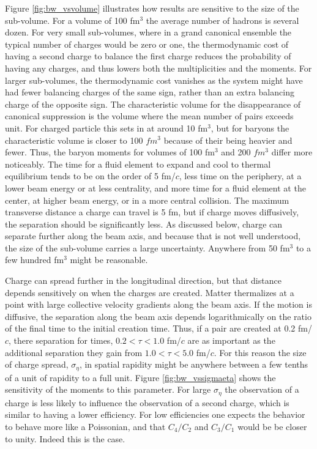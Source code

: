 {Figure \ref{fig:bw_vsvolume} illustrates how results are sensitive to the size of the sub-volume. For a volume of 100 fm$^3$ the average number of hadrons is several dozen. For very small sub-volumes, where in a grand canonical ensemble the typical number of charges would be zero or one, the thermodynamic cost of having a second charge to balance the first charge reduces the probability of having any charges, and thus lowers both the multiplicities and the moments. For larger sub-volumes, the thermodynamic cost vanishes as the system might have had fewer balancing charges of the same sign, rather than an extra balancing charge of the opposite sign. The characteristic volume for the disappearance of canonical suppression is the volume where the mean number of pairs exceeds unit. For charged particle this sets in at around 10 fm$^3$, but for baryons the characteristic volume is closer to 100 $fm^3$ because of their being heavier and fewer. Thus, the baryon moments for volumes of 100 fm$^3$ and 200 $fm^3$ differ more noticeably. The time for a fluid element to expand and cool to thermal equilibrium tends to be on the order of 5 fm/$c$, less time on the periphery, at a lower beam energy or at less centrality, and more time for a fluid element at the center, at higher beam energy, or in a more central collision. The maximum transverse distance a charge can travel is 5 fm, but if charge moves diffusively, the separation should be significantly less. As discussed below, charge can separate further along the beam axis, and because that is not well understood, the size of the sub-volume carries a large uncertainty. Anywhere from 50 fm$^3$ to a few hundred fm$^3$ might be reasonable. 

Charge can spread further in the longitudinal direction, but that distance depends sensitively on when the charges are created. Matter thermalizes at a point with large collective velocity gradients along the beam axis. If the motion is diffusive, the separation along the beam axis depends logarithmically on the ratio of the final time to the initial creation time.  Thus, if a pair are created at 0.2 fm/$c$, there separation for times, $0.2<\tau<1.0$ fm/$c$ are as important as the additional separation they gain from $1.0<\tau<5.0$ fm/$c$. For this reason the size of charge spread, $\sigma_\eta$, in spatial rapidity might be anywhere between a few tenths of a unit of rapidity to a full unit. Figure \ref{fig:bw_vssigmaeta} shows the sensitivity of the moments to this parameter. For large $\sigma_\eta$ the observation of a charge is less likely to influence the observation of a second charge, which is similar to having a lower efficiency. For low efficiencies one expects the behavior to behave more like a Poissonian, and that $C_4/C_2$ and $C_3/C_1$ would be be closer to unity. Indeed this is the case.

}
